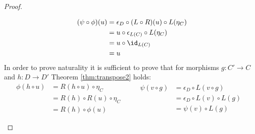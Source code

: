 \begin{theorem}
\begin{proof}
\begin{description}
\[        \quad
        \begin{aligned}
          (\psi\circ \phi)(u)
          &= \epsilon_D \circ (L\circ R)(u) \circ L(\eta_C)\\
          &= u \circ \epsilon_{L(C)} \circ L(\eta_C)\\
          &= u \circ \id_{L(C)}\\
          &= u
        \end{aligned}
        \] In order to prove naturality it is sufficient to prove that for
        morphisms $g:C'\to C$ and $h:D\to D'$ Theorem \ref{thm:transpose2}
        holds:
        \[
          \begin{aligned}
            \phi(h\circ u)
              &= R(h\circ u) \circ \eta_C\\
              &= R(h) \circ R(u) \circ \eta_C\\
              &= R(h) \circ \phi(u)
          \end{aligned}
          \qquad
          \begin{aligned}
            \psi(v\circ g)
              &= \epsilon_D \circ L(v\circ g)\\
              &= \epsilon_D \circ L(v) \circ L(g)\\
              &= \psi(v) \circ L(g)
          \end{aligned}
        \]
    \end{description}
  \end{proof}
\end{theorem}
